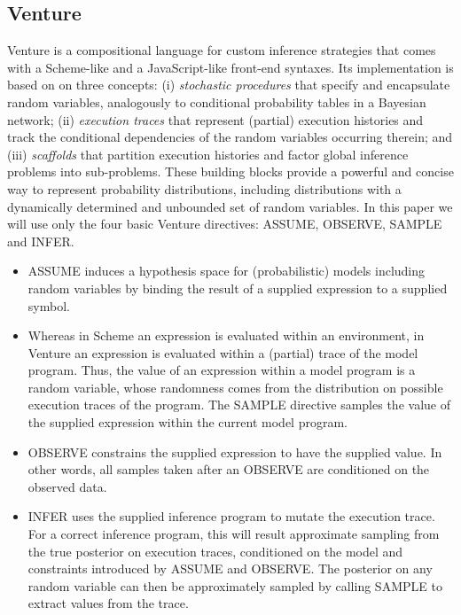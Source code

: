 \documentclass{article} %
\begin{document}
\subsection{Venture}
Venture is a compositional language for custom inference strategies that comes with a Scheme-like and a JavaScript-like front-end syntaxes.
Its implementation is based on on three concepts:
  (i) \emph{stochastic procedures} that specify and encapsulate random variables, analogously to conditional probability tables in a Bayesian network;
  (ii) \emph{execution traces} that represent (partial) execution histories and track the conditional dependencies of the random variables occurring therein; and
  (iii) \emph{scaffolds} that partition execution histories and factor global inference problems into sub-problems.
These building blocks provide a powerful and concise way to represent probability distributions, including distributions with a dynamically determined and unbounded set of random variables.
In this paper we will use only the four basic Venture directives: ASSUME, OBSERVE, SAMPLE and INFER.
\begin{itemize}
  \item ASSUME induces a hypothesis space for (probabilistic) models including random variables by binding the result of a supplied expression to a supplied symbol.
  \item Whereas in Scheme an expression is evaluated within an environment, in Venture an expression is evaluated within a (partial) trace of the model program.
    Thus, the value of an expression within a model program is a random variable, whose randomness comes from the distribution on possible execution traces of the program.
    The SAMPLE directive samples the value of the supplied expression within the current model program.
  \item OBSERVE constrains the supplied expression to have the supplied value.
    In other words, all samples taken after an OBSERVE are conditioned on the observed data.
  \item INFER uses the supplied inference program to mutate the execution trace.
    For a correct inference program, this will result approximate sampling from the true posterior on execution traces, conditioned on the model and constraints introduced by ASSUME and OBSERVE.
    The posterior on any random variable can then be approximately sampled by calling SAMPLE to extract values from the trace.
\end{itemize}
\end{document}
